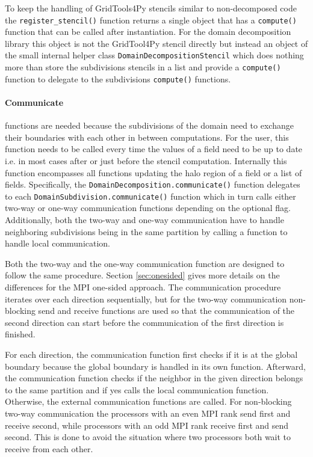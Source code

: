 To keep the handling of GridTools4Py stencils similar to non-decomposed code the \texttt{register\_stencil()} function returns a single object that has a \texttt{compute()} function that can be called after instantiation.
For the domain decomposition library this object is not the GridTool4Py stencil directly but instead an object of the small internal helper class \texttt{DomainDecompositionStencil} which does nothing more than store the subdivisions stencils in a list and provide a \texttt{compute()} function to delegate to the subdivisions \texttt{compute()} functions.

\paragraph{Communicate } functions are needed because the subdivisions of the domain need to exchange their boundaries with each other in between computations.
For the user, this function needs to be called every time the values of a field need to be up to date i.e. in most cases after or just before the stencil computation.
Internally this function encompasses all functions updating the halo region of a field or a list of fields.
Specifically, the \texttt{DomainDecomposition.communicate()} function delegates to each \texttt{DomainSubdivision.communicate()} function which in turn calls either two-way or one-way communication functions depending on the optional flag.
Additionally, both the two-way and one-way communication have to handle neighboring subdivisions being in the same partition by calling a function to handle local communication.

Both the two-way and the one-way communication function are designed to follow the same procedure.
Section \ref{sec:onesided} gives more details on the differences for the MPI one-sided approach.
The communication procedure iterates over each direction sequentially, but for the two-way communication non-blocking send and receive functions are used so that the communication of the second direction can start before the communication of the first direction is finished.

For each direction, the communication function first checks if it is at the global boundary because the global boundary is handled in its own function.
Afterward, the communication function checks if the neighbor in the given direction belongs to the same partition and if yes calls the local communication function.
Otherwise, the external communication functions are called.
For non-blocking two-way communication the processors with an even MPI rank send first and receive second, while processors with an odd MPI rank receive first and send second.
This is done to avoid the situation where two processors both wait to receive from each other.

